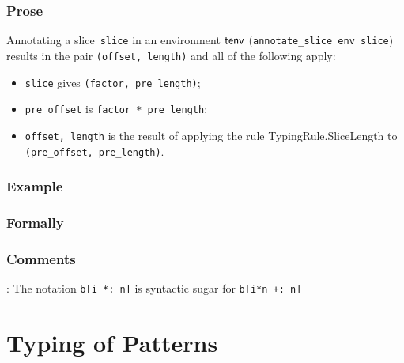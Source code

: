 \documentclass{book}
\begin{document}
  \subsection{Prose}
      Annotating a slice~\texttt{slice} in an environment $\textsf{tenv}$
(\texttt{annotate\_slice env slice}) results in the pair \texttt{(offset,
length)} and all of the following apply:
   \begin{itemize}
   \item \texttt{slice} gives \texttt{(factor, pre\_length)};
   \item \texttt{pre\_offset} is \texttt{factor * pre\_length};
   \item \texttt{offset, length} is the result of applying the rule TypingRule.SliceLength to \texttt{(pre\_offset, pre\_length)}.
   \end{itemize}

  \subsection{Example}



\begin{emptyformal}
    \subsection{Formally}
\end{emptyformal}

\subsection{Comments}
    : The notation \texttt{b[i *: n]} is syntactic sugar for \texttt{b[i*n +: n]}

\chapter{Typing of Patterns}
\end{document}
